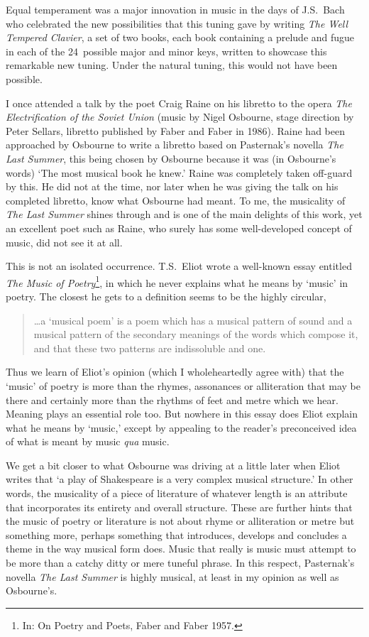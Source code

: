 Equal temperament was a major innovation in music in the days of
J.S.~Bach who celebrated the new possibilities that this tuning gave
by writing \textit{The Well Tempered Clavier}, a set of two books,
each book containing a prelude and fugue in each of the 24~possible
major and minor keys, written to showcase this remarkable new tuning.
Under the natural tuning, this would not have been possible.

\fugue

I once attended a talk by the poet Craig Raine on his libretto to the
opera \textit{The Electrification of the Soviet Union} (music by Nigel
Osbourne, stage direction by Peter Sellars, libretto published by
Faber and Faber in 1986).  Raine had been approached by Osbourne to
write a libretto based on Pasternak's novella \textit{The Last
Summer}, this being chosen by Osbourne because it was (in Osbourne's
words) `The most musical book he knew.'  Raine was completely taken
off-guard by this.  He did not at the time, nor later when he was
giving the talk on his completed libretto, know what Osbourne had
meant.  To me, the musicality of \textit{The Last Summer} shines
through and is one of the main delights of this work, yet an excellent
poet such as Raine, who surely has some well-developed concept of
music, did not see it at all.

This is not an isolated occurrence. T.S.~Eliot wrote a well-known
essay entitled \textit{The Music of Poetry}\footnote{In: On Poetry and
Poets, Faber and Faber 1957.}, in which he never explains what he
means by `music' in poetry.  The closest he gets to a definition seems
to be the highly circular,
\begin{quote}
\ldots a `musical poem' is a poem which has a musical pattern
of sound and a musical pattern of the secondary meanings of the words
which compose it, and that these two patterns are indissoluble and
one.
\end{quote}

Thus we learn of Eliot's opinion (which I wholeheartedly agree with)
that the `music' of poetry is more than the rhymes, assonances or
alliteration that may be there and certainly more than the rhythms of
feet and metre which we hear.  Meaning plays an essential role too.
But nowhere in this essay does Eliot explain what he means by `music,'
except by appealing to the reader's preconceived idea of what is meant
by music \textit{qua} music.

We get a bit closer to what Osbourne was driving at a little later
when Eliot writes that `a play of Shakespeare is a very complex
musical structure.'  In other words, the musicality of a piece of
literature of whatever length is an attribute that incorporates its
entirety and overall structure.  These are further hints that the
music of poetry or literature is not about rhyme or alliteration or
metre but something more, perhaps something that introduces, develops
and concludes a theme in the way musical form does.  Music that really
is music must attempt to be more than a catchy ditty or mere tuneful
phrase.  In this respect, Pasternak's novella \textit{The Last Summer}
is highly musical, at least in my opinion as well as Osbourne's.


